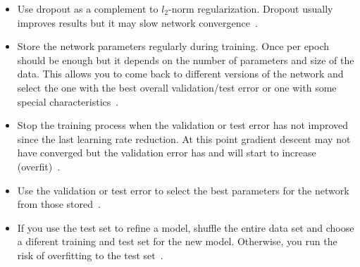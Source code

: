 \begin{itemize}
	\item Use dropout as a complement to $l_2$-norm regularization. Dropout usually improves results but it may slow network convergence~\cite{Krizhevsky2012}.

	\item Store the network parameters regularly during training. Once per epoch should be enough but it depends on the number of parameters and size of the data. This allows you to come back to different versions of the network and select the one with the best overall validation/test error or one with some special characteristics~\cite{Bengio2014}.

	\item Stop the training process when the validation or test error has not improved since the last learning rate reduction. At this point gradient descent may not have converged but the validation error has and will start to increase (overfit)~\cite{Bengio2012}.

	\item Use the validation or test error to select the best parameters for the network from those stored~\cite{Bengio2014}. 

	\item If you use the test set to refine a model, shuffle the entire data set and choose a diferent training and test set for the new model. Otherwise, you run the risk of overfitting to the test set~\cite{Ng2014}.
\end{itemize}




